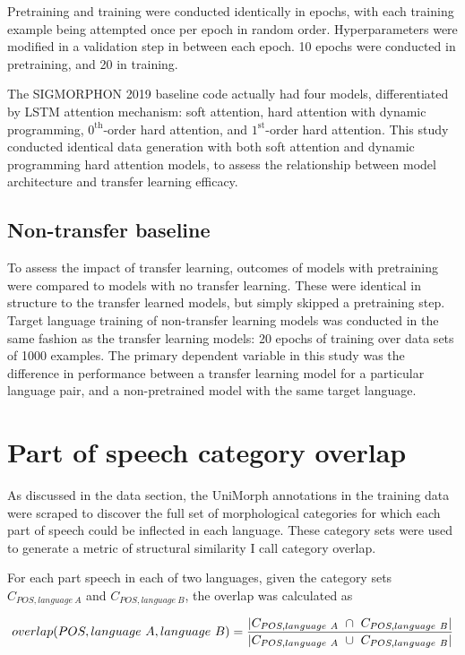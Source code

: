 Pretraining and training were conducted identically in epochs, with each training example being attempted once per epoch in random order. Hyperparameters were modified in a validation step in between each epoch. 10 epochs were conducted in pretraining, and 20 in training.

The SIGMORPHON 2019 baseline code actually had four models, differentiated by LSTM attention mechanism: soft attention, hard attention with dynamic programming, $0^{\text{th}}$-order hard attention, and $1^{\text{st}}$-order hard attention. This study conducted identical data generation with both soft attention and dynamic programming hard attention models, to assess the relationship between model architecture and transfer learning efficacy.

\subsection{Non-transfer baseline}

To assess the impact of transfer learning, outcomes of models with pretraining were compared to models with no transfer learning. These were identical in structure to the transfer learned models, but simply skipped a pretraining step. Target language training of non-transfer learning models was conducted in the same fashion as the transfer learning models: 20 epochs of training over data sets of 1000 examples. The primary dependent variable in this study was the difference in performance between a transfer learning model for a particular language pair, and a non-pretrained model with the same target language.

\section{Part of speech category overlap}
\label{sec:CO}

As discussed in the data section, the UniMorph annotations in the training data were scraped to discover the full set of morphological categories for which each part of speech could be inflected in each language. These category sets were used to generate a metric of structural similarity I call category overlap.

For each part speech in each of two languages, given the category sets $C_{POS, language\ A}$ and $C_{POS, language\ B}$, the overlap was calculated as

\[overlap(POS, language\ A, language\ B) = \frac{\abs*{C_{POS, language\ A}\ \cap\ C_{POS, language\ B}}}{\abs*{C_{POS, language\ A}\ \cup\ C_{POS, language\ B}}}\]

